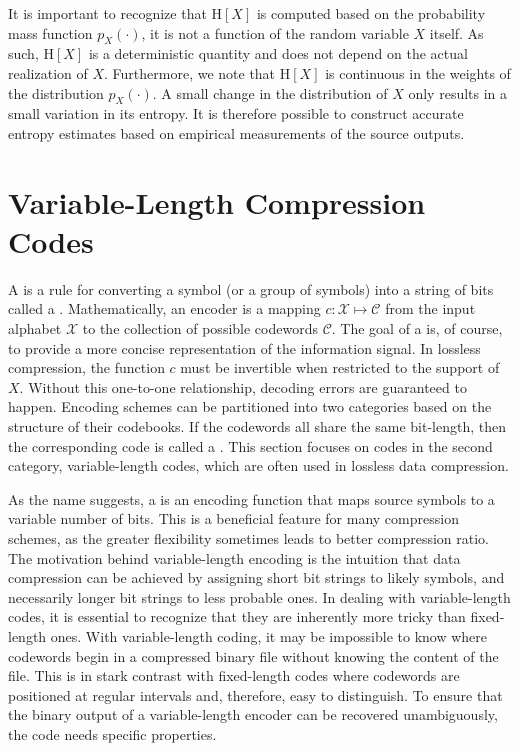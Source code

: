 It is important to recognize that $\mathrm{H}[X]$ is computed based on the probability mass function $p_X(\cdot)$, it is not a function of the random variable $X$ itself.
As such, $\mathrm{H}[X]$ is a deterministic quantity and does not depend on the actual realization of $X$.
Furthermore, we note that $\mathrm{H}[X]$ is continuous in the weights of the distribution $p_X(\cdot)$.
A small change in the distribution of $X$ only results in a small variation in its entropy.
It is therefore possible to construct accurate entropy estimates based on empirical measurements of the source outputs.


\section{Variable-Length Compression Codes}

A  is a rule for converting a symbol (or a group of symbols) into a string of bits called a .
Mathematically, an encoder is a mapping $c : \mathcal{X} \mapsto \mathcal{C}$ from the input alphabet $\mathcal{X}$ to the collection of possible codewords $\mathcal{C}$.
The goal of a  is, of course, to provide a more concise representation of the information signal.
In lossless compression, the function $c$ must be invertible when restricted to the support of $X$.
Without this one-to-one relationship, decoding errors are guaranteed to happen.
Encoding schemes can be partitioned into two categories based on the structure of their codebooks.
If the codewords all share the same bit-length, then the corresponding code is called a .
This section focuses on codes in the second category, variable-length codes, which are often used in lossless data compression.

As the name suggests, a  is an encoding function that maps source symbols to a variable number of bits.
This is a beneficial feature for many compression schemes, as the greater flexibility sometimes leads to better compression ratio.
The motivation behind variable-length encoding is the intuition that data compression can be achieved by assigning short bit strings to likely symbols, and necessarily longer bit strings to less probable ones.
In dealing with variable-length codes, it is essential to recognize that they are inherently more tricky than fixed-length ones.
With variable-length coding, it may be impossible to know where codewords begin in a compressed binary file without knowing the content of the file.
This is in stark contrast with fixed-length codes where codewords are positioned at regular intervals and, therefore, easy to distinguish.
To ensure that the binary output of a variable-length encoder can be recovered unambiguously, the code needs specific properties.

